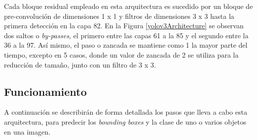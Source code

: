 Cada bloque residual empleado en esta arquitectura es sucedido por un bloque de pre-convolución de dimensiones 1 x 1 y filtros de dimensiones 3 x 3 hasta la primera detección en la capa 82. En la Figura \ref{yolov3Architecture} se observan dos saltos o \textit{by-passes}, el primero entre las capas 61 a la 85 y el segundo entre la 36 a la 97. Así mismo, el paso o zancada se mantiene como 1 la mayor parte del tiempo, excepto en 5 casos, donde un valor de zancada de
2 se utiliza para la reducción de tamaño, junto con un filtro de 3 x 3.
\subsection{Funcionamiento}
A continuación se describirán de forma detallada los pasos que lleva a cabo esta arquitectura, para predecir los \textit{bounding boxes} y la clase de uno o varios objetos en una imagen.
